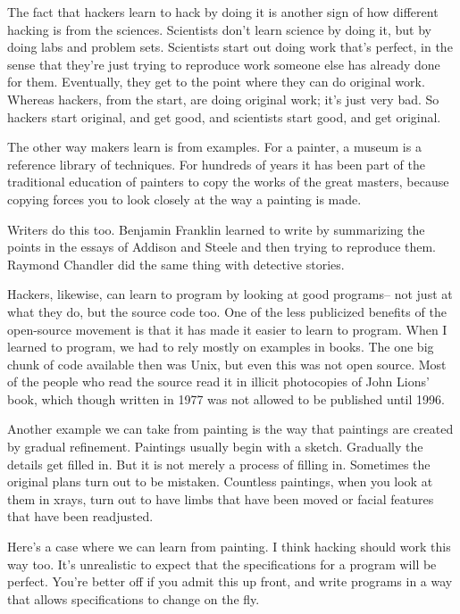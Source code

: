 The fact that hackers learn to hack by doing it is another sign of how
different hacking is from the sciences. Scientists don't learn science
by doing it, but by doing labs and problem sets. Scientists start out
doing work that's perfect, in the sense that they're just trying to
reproduce work someone else has already done for them. Eventually, they
get to the point where they can do original work. Whereas hackers, from
the start, are doing original work; it's just very bad. So hackers start
original, and get good, and scientists start good, and get original.

The other way makers learn is from examples. For a painter, a museum is
a reference library of techniques. For hundreds of years it has been
part of the traditional education of painters to copy the works of the
great masters, because copying forces you to look closely at the way a
painting is made.

Writers do this too. Benjamin Franklin learned to write by summarizing
the points in the essays of Addison and Steele and then trying to
reproduce them. Raymond Chandler did the same thing with detective
stories.

Hackers, likewise, can learn to program by looking at good programs--
not just at what they do, but the source code too. One of the less
publicized benefits of the open-source movement is that it has made it
easier to learn to program. When I learned to program, we had to rely
mostly on examples in books. The one big chunk of code available then
was Unix, but even this was not open source. Most of the people who read
the source read it in illicit photocopies of John Lions' book, which
though written in 1977 was not allowed to be published until 1996.

Another example we can take from painting is the way that paintings are
created by gradual refinement. Paintings usually begin with a sketch.
Gradually the details get filled in. But it is not merely a process of
filling in. Sometimes the original plans turn out to be mistaken.
Countless paintings, when you look at them in xrays, turn out to have
limbs that have been moved or facial features that have been readjusted.

Here's a case where we can learn from painting. I think hacking should
work this way too. It's unrealistic to expect that the specifications
for a program will be perfect. You're better off if you admit this up
front, and write programs in a way that allows specifications to change
on the fly.


